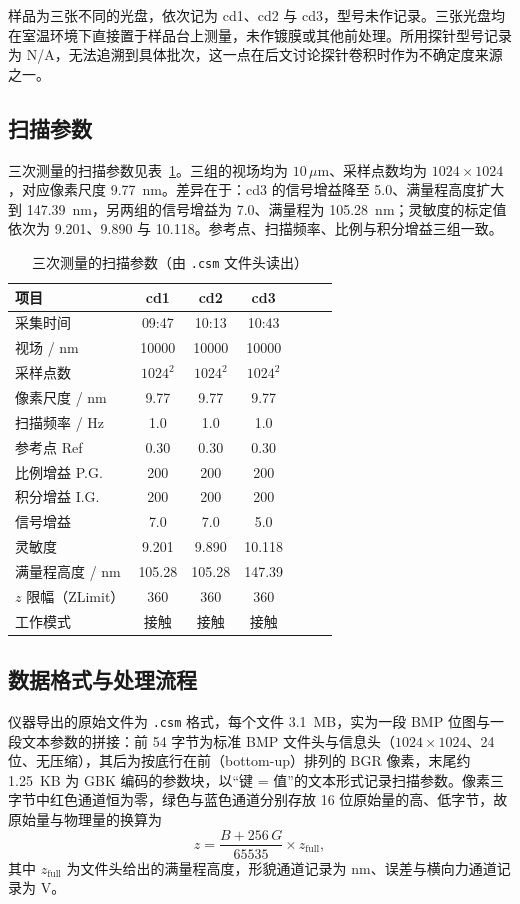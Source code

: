 \documentclass[12pt,a4paper,fontset=windows]{ctexart}
\begin{document}
样品为三张不同的光盘，依次记为 cd1、cd2 与 cd3，型号未作记录。三张光盘均在室温环境下直接置于样品台上测量，未作镀膜或其他前处理。所用探针型号记录为 N/A，无法追溯到具体批次，这一点在后文讨论探针卷积时作为不确定度来源之一。

\subsection{扫描参数}

三次测量的扫描参数见表~\ref{tab:params}。三组的视场均为 $10\,\mu\mathrm{m}$、采样点数均为 $1024\times1024$，对应像素尺度 9.77~nm。差异在于：cd3 的信号增益降至 5.0、满量程高度扩大到 147.39~nm，另两组的信号增益为 7.0、满量程为 105.28~nm；灵敏度的标定值依次为 9.201、9.890 与 10.118。参考点、扫描频率、比例与积分增益三组一致。

\begin{table}[H]
\centering
\caption{三次测量的扫描参数（由 \texttt{.csm} 文件头读出）}
\label{tab:params}
\small
{}
\begin{tabular}{@{}lcccccc@{}}
\toprule
项目 & cd1 & cd2 & cd3 \\
\midrule
采集时间 & 09:47 & 10:13 & 10:43 \\
视场 / nm & 10000 & 10000 & 10000 \\
采样点数 & $1024^2$ & $1024^2$ & $1024^2$ \\
像素尺度 / nm & 9.77 & 9.77 & 9.77 \\
扫描频率 / Hz & 1.0 & 1.0 & 1.0 \\
参考点 Ref & 0.30 & 0.30 & 0.30 \\
比例增益 P.G. & 200 & 200 & 200 \\
积分增益 I.G. & 200 & 200 & 200 \\
信号增益 & 7.0 & 7.0 & 5.0 \\
灵敏度 & 9.201 & 9.890 & 10.118 \\
满量程高度 / nm & 105.28 & 105.28 & 147.39 \\
$z$ 限幅（ZLimit）& 360 & 360 & 360 \\
工作模式 & 接触 & 接触 & 接触 \\
\bottomrule
\end{tabular}
\end{table}

\subsection{数据格式与处理流程}

仪器导出的原始文件为 \texttt{.csm} 格式，每个文件 3.1~MB，实为一段 BMP 位图与一段文本参数的拼接：前 54 字节为标准 BMP 文件头与信息头（$1024\times1024$、24 位、无压缩），其后为按底行在前（bottom-up）排列的 BGR 像素，末尾约 1.25~KB 为 GBK 编码的参数块，以“键 = 值”的文本形式记录扫描参数。像素三字节中红色通道恒为零，绿色与蓝色通道分别存放 16 位原始量的高、低字节，故原始量与物理量的换算为
\begin{equation}
z = \frac{B + 256\,G}{65535}\times z_{\text{full}},
\label{eq:decode}
\end{equation}
其中 $z_{\text{full}}$ 为文件头给出的满量程高度，形貌通道记录为 nm、误差与横向力通道记录为 V。
\end{document}
